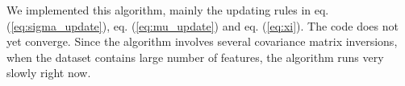 We implemented this algorithm, mainly the updating rules in eq. (\ref{eq:sigma_update}), eq. (\ref{eq:mu_update}) and eq. (\ref{eq:xi}). The code does not yet converge. Since the algorithm involves several covariance matrix inversions, when the dataset contains large number of features, the algorithm runs very slowly right now.
